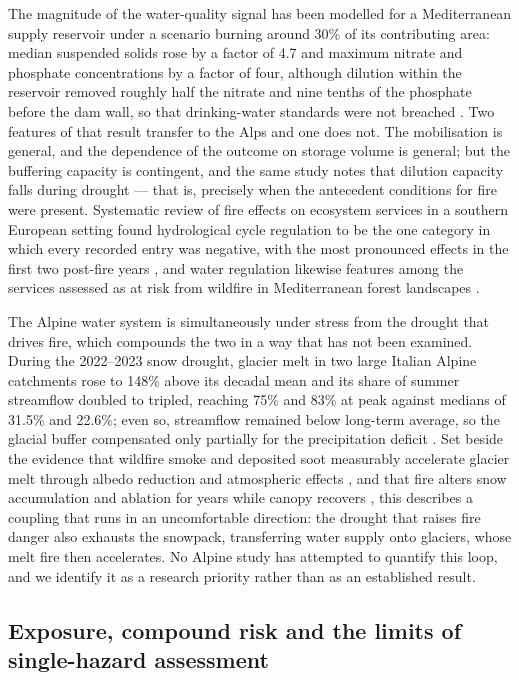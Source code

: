 \documentclass[11pt,a4paper]{article}
\begin{document}
The magnitude of the water-quality signal has been modelled for a Mediterranean supply reservoir under a scenario burning around 30\% of its contributing area: median suspended solids rose by a factor of 4.7 and maximum nitrate and phosphate concentrations by a factor of four, although dilution within the reservoir removed roughly half the nitrate and nine tenths of the phosphate before the dam wall, so that drinking-water standards were not breached \citep{basso_potential_2021}. Two features of that result transfer to the Alps and one does not. The mobilisation is general, and the dependence of the outcome on storage volume is general; but the buffering capacity is contingent, and the same study notes that dilution capacity falls during drought --- that is, precisely when the antecedent conditions for fire were present. Systematic review of fire effects on ecosystem services in a southern European setting found hydrological cycle regulation to be the one category in which every recorded entry was negative, with the most pronounced effects in the first two post-fire years \citep{misseyanni_impact_2025}, and water regulation likewise features among the services assessed as at risk from wildfire in Mediterranean forest landscapes \citep{lecinadiaz_assessing_2021}.

The Alpine water system is simultaneously under stress from the drought that drives fire, which compounds the two in a way that has not been examined. During the 2022--2023 snow drought, glacier melt in two large Italian Alpine catchments rose to 148\% above its decadal mean and its share of summer streamflow doubled to tripled, reaching 75\% and 83\% at peak against medians of 31.5\% and 22.6\%; even so, streamflow remained below long-term average, so the glacial buffer compensated only partially for the precipitation deficit \citep{leone_20222023_2026}. Set beside the evidence that wildfire smoke and deposited soot measurably accelerate glacier melt through albedo reduction and atmospheric effects \citep{aubrywake_fire_2022}, and that fire alters snow accumulation and ablation for years while canopy recovers \citep{koshkin_wildfire_2022}, this describes a coupling that runs in an uncomfortable direction: the drought that raises fire danger also exhausts the snowpack, transferring water supply onto glaciers, whose melt fire then accelerates. No Alpine study has attempted to quantify this loop, and we identify it as a research priority rather than as an established result.

\subsection{Exposure, compound risk and the limits of single-hazard assessment}
\end{document}
